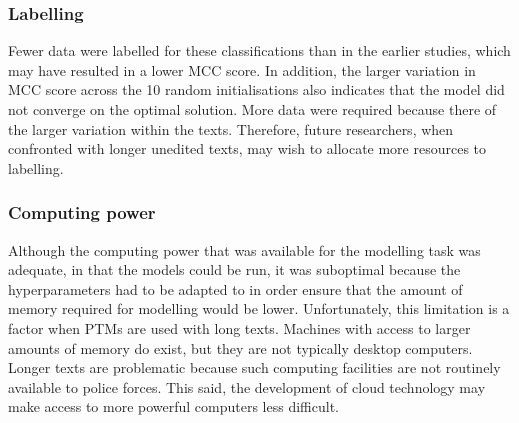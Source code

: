 \subsubsection{Labelling} Fewer data were labelled for these classifications than in the earlier studies, which may have resulted in a lower MCC score. In addition, the larger variation in MCC score across the 10 random initialisations also indicates that the model did not converge on the optimal solution. More data were required because there of the larger variation within the texts. Therefore, future researchers, when confronted with longer unedited texts, may wish to allocate more resources to labelling.

\subsubsection{Computing power}Although the computing power that was available for the modelling task was adequate, in that the models could be run, it was suboptimal because the hyperparameters had to be adapted to in order ensure that the amount of memory required for modelling would be lower. Unfortunately, this limitation is a factor when PTMs are used with long texts. Machines with access to larger amounts of memory do exist, but they are not typically desktop computers. Longer texts are problematic because such computing facilities are not routinely available to police forces. This said, the development of cloud technology may make access to more powerful computers less difficult.

 
